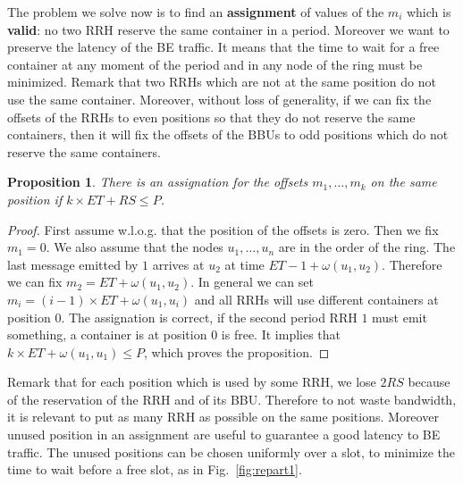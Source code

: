 \documentclass[]{algotel}
\newtheorem{prop}{Proposition}
\begin{document}
The problem we solve now is to find an \textbf{assignment} of values of the $m_i$ which is \textbf{valid}: no two RRH reserve the same container in a period. Moreover we want to preserve the latency of the BE traffic. It means that the time to wait for a 
free container at any moment of the period and in any node of the ring must be minimized. 
Remark that two RRHs which are not at the same position do not use the same container. Moreover, without loss of generality, 
if we can fix the offsets of the RRHs to even positions so that they do not reserve the same containers, then it will fix the offsets of the BBUs to odd positions which do not reserve the same containers. 


% 


\begin{prop}
There is an assignation for the offsets $m_1, \dots, m_k$ on the same position if  $k\times ET + RS \leq P$.
\end{prop}
\begin{proof}
 First assume w.l.o.g. that the position of the offsets is zero. Then we fix $m_1 = 0$. We also assume that the 
 nodes $u_1,\dots,u_n$ are in the order of the ring.  The last message emitted by $1$ arrives at $u_2$ at time $ET - 1 + \omega(u_1,u_2)$. Therefore we can fix $m_2 =  ET  + \omega(u_1,u_2)$. In general we can set $m_i = (i-1) \times ET + \omega(u_1,u_i)$ and all RRHs will use different containers at position $0$. The assignation is correct, if the second period 
 RRH $1$ must emit something, a container is at position $0$ is free. It implies that  $k \times ET + \omega(u_1,u_1) \leq P$, which proves the proposition.
\end{proof}

Remark that for each position which is used by some RRH, we lose $2RS$ because of the reservation of the RRH and of its BBU.
Therefore to not waste bandwidth, it is relevant to put as many RRH as possible on the same positions. Moreover unused position in an assignment are useful to guarantee a good latency to BE traffic. The unused positions can be chosen uniformly over a slot, to minimize the time to wait before a free slot, as in Fig.~\ref{fig:repart1}.  
\end{document}
